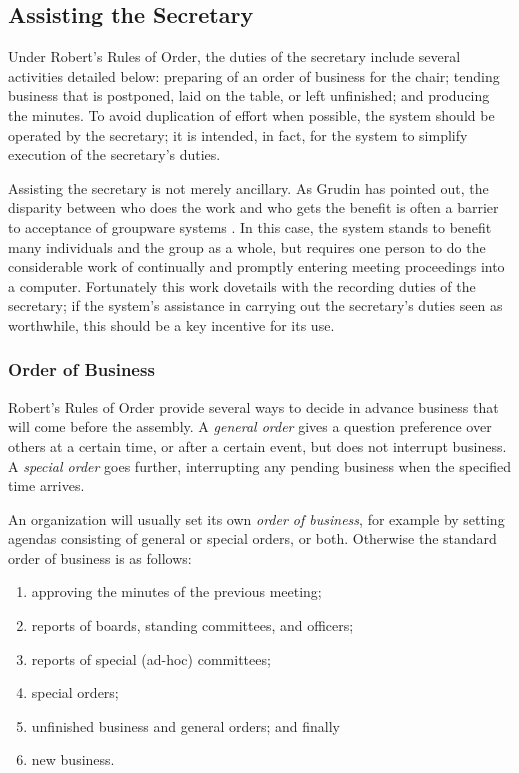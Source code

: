 \documentclass{acm_proc_article-sp}
\begin{document}
\subsection{Assisting the Secretary}
\label{sec:secretary}


Under Robert's Rules of Order, the duties of the secretary include several activities detailed below: preparing of an order of business for the chair; tending business that is postponed, laid on the table, or left unfinished; and producing the minutes. To avoid duplication of effort when possible, the system should be operated by the secretary; it is intended, in fact, for the system to simplify execution of the secretary's duties.

Assisting the secretary is not merely ancillary. As Grudin has pointed out, the disparity between who does the work and who gets the benefit is often a barrier to acceptance of groupware systems \cite{grudin:groupware}. In this case, the system stands to benefit many individuals and the group as a whole, but requires one person to do the considerable work of continually and promptly entering meeting proceedings into a computer. Fortunately this work dovetails with the recording duties of the secretary; if the system's assistance in carrying out the secretary's duties seen as worthwhile, this should be a key incentive for its use.

\subsubsection*{Order of Business}


Robert's Rules of Order provide several ways to decide in advance business that will come before the assembly. A \emph{general order} gives a question preference over others at a certain time, or after a certain event, but does not interrupt business. A \emph{special order} goes further, interrupting any pending business when the specified time arrives.

An organization will usually set its own \emph{order of business}, for example by setting agendas consisting of general or special orders, or both. Otherwise the standard order of business is as follows:

\begin{enumerate}
 \item approving the minutes of the previous meeting;
 \item reports of boards, standing committees, and officers;
 \item reports of special (ad-hoc) committees;
 \item special orders;
 \item unfinished business and general orders; and finally
 \item new business.
\end{enumerate}
\end{document}
